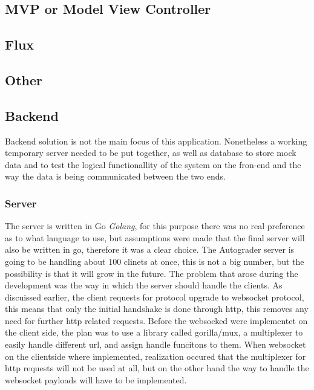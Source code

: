 \subsection{MVP or Model View Controller}\label{sec:mvc}

\subsection{Flux}\label{sec:flux}

\subsection{Other}

\subsection{Backend}
Backend solution is not the main focus of this application. Nonetheless a working temporary server needed to be put together, as well as database to store mock data and to test the logical functionallity of the system on the fron-end and the way the data is being communicated between the two ends.
\subsubsection{Server}
The server is written in Go \emph{Golang}, for this purpose there was no real  preference as to what language to use, but assumptions were made that the final server will also be written in go, therefore it was a clear choice. The Autograder server is going to be handling about 100 clinets at once,  this is not a big number, but the possibility is that it will grow in the future. The problem that arose during the development was the way in which the server should handle the clients. As discuissed earlier, the client requests for protocol upgrade to websocket protocol, this means that only the initial handshake is done through http, this removes any need for further http related requests. Before the websocked were implementet on the client side, the plan was to use a library called gorilla/mux, a multiplexer to easily handle different url, and assign handle funcitons to them. When websocket on the clientside where implemented, realization occured that the multiplexer for http requests will not be used at all, but on the other hand the way to handle the websocket payloads will have to be implemented. 
